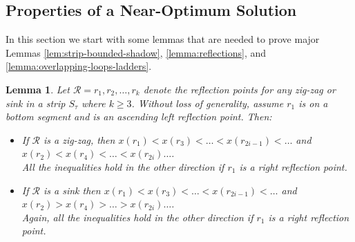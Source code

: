 \documentclass[10pt,a4paper]{amsart}
\theoremstyle{thmstyleone}
\newtheorem{lemma}{Lemma}
\begin{document}
\subsection{Properties of a Near-Optimum Solution}

In this section we start with some lemmas that are needed to prove major Lemmas \ref{lem:strip-bounded-shadow}, \ref{lemma:reflections}, and \ref{lemma:overlapping-loops-ladders}.
 
\begin{lemma}\label{obs:x-order}
	Let $ \mathcal R = r_1, r_2, \dots, r_k $ denote the reflection points for any zig-zag or sink in a strip $S_\tau$ where $k\geq 3$. Without loss of generality, assume $r_1$ is on a bottom segment and is an ascending left reflection point. Then:
    \begin{itemize}
        \item If $\mathcal R$ is a zig-zag, then
            $x(r_1) < x(r_3) < \dots < x(r_{2i-1})<\ldots$ and $x(r_2) < x(r_4) < \dots < x(r_{2i})\ldots$.\\
            All the inequalities hold in the other direction if $r_1$ is a right reflection point.

        
        \item If $\mathcal R$ is a sink then
            $x(r_1) < x(r_3) < \dots < x(r_{2i-1})<\ldots$ and $x(r_2) > x(r_4) > \dots > x(r_{2i})\ldots$.\\ 
            Again, all the inequalities hold in the other direction if $r_1$ is a right reflection point.  
    \end{itemize}
\end{lemma}
\end{document}
